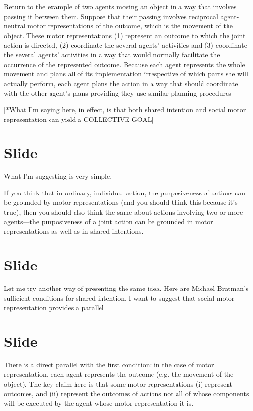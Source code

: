 \documentclass[12pt,\papersize]{extarticle}
\begin{document}
Return to the example of two agents moving an object in a way that involves passing it between them.
Suppose that their passing involves reciprocal agent-neutral motor representations of the outcome, which is the movement of the object. 
These motor representations
(1) represent an outcome to which the joint action is directed,
(2) coordinate the several agents’ activities
and 
(3) coordinate the several agents’ activities in a way that would normally facilitate the occurrence of the represented outcome.
Because each agent represents the whole movement and plans all of its implementation irrespective of which parts she will actually perform, each agent plans the action in a way that should coordinate with the other agent’s plans providing they use similar planning procedures

[*What I’m saying here, in effect, is that both shared intention and social motor representation can yield a COLLECTIVE GOAL]



\section{Slide}
What I’m suggesting is very simple.

If you think that in ordinary, individual action, the purposiveness of actions can be grounded by motor representations
(and you should think this because it’s true),
then you should also think the same about actions involving two or more agents---the purposiveness of a joint action can be grounded in motor representations as well as in shared intentions.



\section{Slide}
Let me try another way of presenting the same idea.
Here are Michael Bratman’s sufficient conditions for shared intention.
I want to suggest that social motor representation provides a parallel



\section{Slide}
There is a direct parallel with the first condition: in the case of motor representation, each agent represents the outcome (e.g. the movement of the object).
The key claim here is that some motor representations (i) represent outcomes, and (ii) represent the outcomes of actions not all of whose components will be executed by the agent whose motor representation it is.
\end{document}
